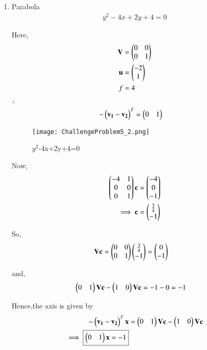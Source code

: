 \documentclass[journal,12pt,twocolumn]{IEEEtran}
\begin{document}
\begin{enumerate}
    \item Parabola
    \begin{align}
    y^2-4x+2y+4 = 0
    \end{align}
    
    Here,
    \begin{align}
    \mathbf{V} &= \begin{pmatrix}0 & 0 \\ 0 & 1\end{pmatrix} \\
    \mathbf{u} &= \begin{pmatrix}-2 \\ 1\end{pmatrix} \\
    f &= 4
    \end{align}

    $\therefore$
    \begin{align}
    -\begin{pmatrix}\mathbf{v_1}-\mathbf{v_2}\end{pmatrix}^T &= \begin{pmatrix}0 & 1\end{pmatrix}
    \end{align}
    
    \begin{figure}[!ht]
    \centering
    \texttt{[image: ChallengeProblem5\_2.png]}
    \caption{$y^2$-4x+2y+4=0}
    \label{ex2}	
    \end{figure}
    Now,
    \begin{align}
    \begin{pmatrix}-4 & 1 \\ 0 & 0 \\ 0 & 1\end{pmatrix}\mathbf{c} &= \begin{pmatrix}-4 \\ 0 \\ -1\end{pmatrix}
    \\
    \implies \mathbf{c} &= \begin{pmatrix}\frac{3}{4} \\ -1\end{pmatrix}
    \end{align}

    So,
    \begin{align}
    \mathbf{V}\mathbf{c} &= \begin{pmatrix}0 & 0 \\ 0 & 1\end{pmatrix}\begin{pmatrix}\frac{3}{4} \\ -1\end{pmatrix}=\begin{pmatrix}0 \\ -1\end{pmatrix}
    \end{align}

    and,
    \begin{align}
    \begin{pmatrix}0 & 1\end{pmatrix}\mathbf{V}\mathbf{c} - \begin{pmatrix}1&0\end{pmatrix}\mathbf{V}\mathbf{c} &= -1-0=-1
    \end{align}

    Hence,the axis is given by
    \begin{align}
    -\begin{pmatrix}\mathbf{v_1}-\mathbf{v_2}\end{pmatrix}^T\mathbf{x} &= \begin{pmatrix}0 & 1\end{pmatrix}\mathbf{V}\mathbf{c} - \begin{pmatrix}1 & 0\end{pmatrix}\mathbf{V}\mathbf{c} \\
    \implies \boxed{\begin{pmatrix}0 & 1\end{pmatrix}\mathbf{x} = -1}
    \end{align}
    

\end{enumerate}
\end{document}
